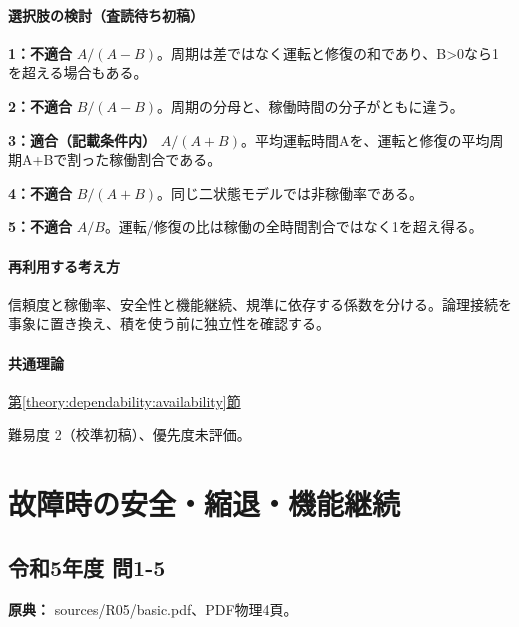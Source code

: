 \paragraph{選択肢の検討（査読待ち初稿）}\mbox{}\par

\noindent\textbf{1：不適合} \(A/(A-B)\)。周期は差ではなく運転と修復の和であり、B>0なら1を超える場合もある。\par

\noindent\textbf{2：不適合} \(B/(A-B)\)。周期の分母と、稼働時間の分子がともに違う。\par

\noindent\textbf{3：適合（記載条件内）} \(A/(A+B)\)。平均運転時間Aを、運転と修復の平均周期A+Bで割った稼働割合である。\par

\noindent\textbf{4：不適合} \(B/(A+B)\)。同じ二状態モデルでは非稼働率である。\par

\noindent\textbf{5：不適合} \(A/B\)。運転/修復の比は稼働の全時間割合ではなく1を超え得る。\par

\paragraph{再利用する考え方} 信頼度と稼働率、安全性と機能継続、規準に依存する係数を分ける。論理接続を事象に置き換え、積を使う前に独立性を確認する。

\paragraph{共通理論} \hyperref[theory:dependability:availability]{第\ref*{theory:dependability:availability}節}

\par 難易度 2（校準初稿）、優先度未評価。

\section{故障時の安全・縮退・機能継続}

\subsection{令和5年度 問1-5}
\label{q:r05-reg-basic-1-5}

\noindent\textbf{原典：} sources/R05/basic.pdf、PDF物理4頁。


